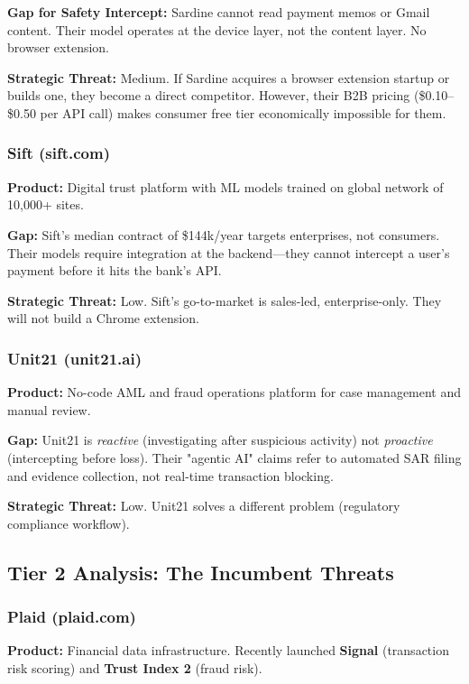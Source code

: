 \documentclass[12pt]{article}
\begin{document}
\textbf{Gap for Safety Intercept:} Sardine cannot read payment memos or Gmail content. Their model operates at the device layer, not the content layer. No browser extension.

\textbf{Strategic Threat:} Medium. If Sardine acquires a browser extension startup or builds one, they become a direct competitor. However, their B2B pricing (\$0.10–\$0.50 per API call) makes consumer free tier economically impossible for them.

\subsubsection{Sift (sift.com)}
\textbf{Product:} Digital trust platform with ML models trained on global network of 10,000+ sites.

\textbf{Gap:} Sift's median contract of \$144k/year targets enterprises, not consumers. Their models require integration at the backend—they cannot intercept a user's payment before it hits the bank's API.

\textbf{Strategic Threat:} Low. Sift's go-to-market is sales-led, enterprise-only. They will not build a Chrome extension.

\subsubsection{Unit21 (unit21.ai)}
\textbf{Product:} No-code AML and fraud operations platform for case management and manual review.

\textbf{Gap:} Unit21 is \textit{reactive} (investigating after suspicious activity) not \textit{proactive} (intercepting before loss). Their "agentic AI" claims refer to automated SAR filing and evidence collection, not real-time transaction blocking.

\textbf{Strategic Threat:} Low. Unit21 solves a different problem (regulatory compliance workflow).

\subsection{Tier 2 Analysis: The Incumbent Threats}

\subsubsection{Plaid (plaid.com)}
\textbf{Product:} Financial data infrastructure. Recently launched \textbf{Signal} (transaction risk scoring) and \textbf{Trust Index 2} (fraud risk).
\end{document}
